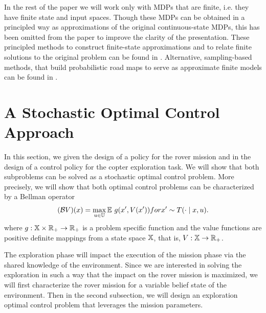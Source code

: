 \documentclass[conference]{IEEEtran}
\renewcommand{\cite}[1]{\citep{#1}}
\newcommand{\sofie}[1]{{\color{orange}#1}}
\begin{document}
In the rest of the paper we will work only with MDPs that are finite, i.e. they have finite state and input spaces.  Though these MDPs can be obtained in a principled way as approximations of the original continuous-state MDPs, this has been omitted from the paper to improve the clarity of the presentation.  
These  principled methods to construct finite-state approximations and to relate finite solutions to the original problem can be found in \cite{Zamani2015,Haesaert2017}. Alternative, sampling-based methods,  that build probabilistic road maps to serve as approximate finite models  can be found in \cite{Kavraki1996, Agha-mohammadi2014}. 

\section{A Stochastic Optimal Control Approach}
In this section, we given the design of a policy for the rover mission and in the design of a control policy for the copter exploration task. 
We will show that both subproblems can be solved as a stochastic optimal control problem. More precisely, we will show that both optimal control problems can be characterized by a Bellman operator 
\begin{equation}
  (\mathcal{B} V) (x) =  \max_{u \in \mathbb{U}}\mathbb E\, \,g(x', V(x'))  \relax{ for } x'\sim  T(\cdot \mid x, u).
\end{equation}
where $g:\mathbb{X} \times \mathbb{R}_+ \rightarrow \mathbb{R}_+$ is a problem specific function and the value functions are positive definite mappings from a state space $\mathbb{X}$, that is, $V:\mathbb{X}\rightarrow  \mathbb{R}_+$. 

The exploration phase will impact the execution of the mission phase via the shared knowledge of the environment. 
Since we are interested in solving the exploration in such a way that the impact on the rover mission is maximized, we will first characterize the rover mission for a variable belief state of the environment.  Then in the second subsection, we will design an exploration optimal control problem that leverages the mission parameters.  
\end{document}

